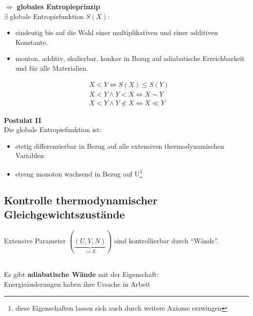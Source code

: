 \documentclass[10pt,article,colorback,accentcolor=tud9d]{scrartcl}
\begin{document}
$\Rightarrow$ \textbf{globales Entropieprinzip}\\
$\exists$ globale Entropiefunktion $S(X)$:
\begin{itemize}
\item eindeutig bis auf die Wahl einer multiplikativen und einer additiven Konstante.
\item monton, additiv, skalierbar, konkav in Bezug auf adiabatische Erreichbarkeit und für alle Materialien.
\end{itemize}
\begin{fleqn}
\begin{equation}
\begin{aligned}
&X<Y \Leftrightarrow S(X) \leq S(Y)\\
&X<Y \wedge Y<X \Leftrightarrow X \sim Y\\
&X<Y \wedge Y\not<X \Leftrightarrow X \ll Y
\end{aligned}
\end{equation}
\end{fleqn}
\textbf{Postulat II}\\
Die globale Entropiefunktion ist:
\begin{itemize}
\item stetig differenzierbar in Bezug auf alle extensiven thermodynamischen Variablen
\item streng monoton wachsend in Bezug auf U\footnote{diese Eigenschaften lassen sich auch durch weitere Axiome erzwingen}
\end{itemize}
\subsection{Kontrolle thermodynamischer Gleichgewichtszustände}
 \begin{doublespacing}Extensive Parameter $(\underbrace{(U,V,N)}_{:=X})$ sind kontrollierbar durch ``Wände''.\end{doublespacing}\\
 Es gibt \textbf{adiabatische Wände} mit der Eigenschaft:\\
 Energieänderungen haben ihre Ursache in Arbeit
\end{document}
